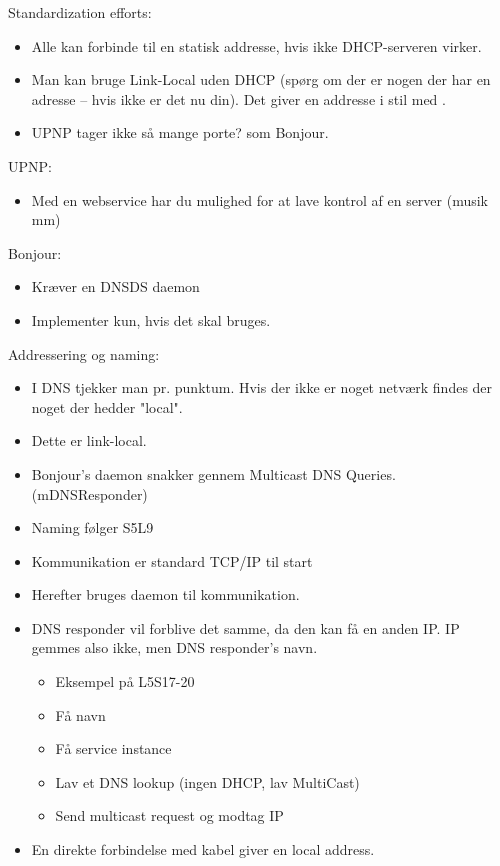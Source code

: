 \documentclass[oneside, 10pt]{article}
\begin{document}
Standardization efforts:
\begin{itemize}
	\item Alle kan forbinde til en statisk addresse, hvis ikke DHCP-serveren virker.
	\item Man kan bruge Link-Local uden DHCP (spørg om der er nogen der har en adresse -- hvis ikke er det nu din). Det giver en addresse i stil med .

	\item UPNP tager ikke så mange porte? som Bonjour.
\end{itemize}

UPNP:
\begin{itemize}
	\item Med en webservice har du mulighed for at lave kontrol af en server (musik mm)
\end{itemize}

Bonjour:
\begin{itemize}
	\item Kræver en DNSDS daemon
	\item Implementer kun, hvis det skal bruges.
\end{itemize}

Addressering og naming:
\begin{itemize}
	\item I DNS tjekker man pr. punktum. Hvis der ikke er noget netværk findes der noget der hedder "local".
	\item Dette er link-local.
	\item Bonjour's daemon snakker gennem Multicast DNS Queries. (mDNSResponder)
	\item Naming følger S5L9
	\item Kommunikation er standard TCP/IP til start
	\item Herefter bruges daemon til kommunikation.
	\item DNS responder vil forblive det samme, da den kan få en anden IP. IP gemmes also ikke, men DNS responder's navn.
	\begin{itemize}
		\item Eksempel på L5S17-20
		\item Få navn
		\item Få service instance
		\item Lav et DNS lookup (ingen DHCP, lav MultiCast)
		\item Send multicast request og modtag IP
	\end{itemize}

	\item En direkte forbindelse med kabel giver en local address.
\end{itemize}
\end{document}
